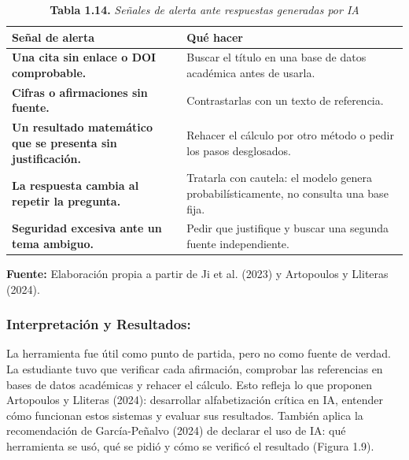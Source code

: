 \begin{table}[htpb!]
\centering
\small\sffamily
\caption{\textbf{Tabla 1.14.} \textit{Señales de alerta ante respuestas generadas por IA}}
\vspace{0.15cm}
\begin{tabularx}{\textwidth}{>{\bfseries}p{5.5cm} >{\raggedright\arraybackslash}X}
\toprule
Señal de alerta & Qué hacer \\
\midrule
Una cita sin enlace o DOI comprobable. & Buscar el título en una base de datos académica antes de usarla. \\
\midrule
Cifras o afirmaciones sin fuente. & Contrastarlas con un texto de referencia. \\
\midrule
Un resultado matemático que se presenta sin justificación. & Rehacer el cálculo por otro método o pedir los pasos desglosados. \\
\midrule
La respuesta cambia al repetir la pregunta. & Tratarla con cautela: el modelo genera probabilísticamente, no consulta una base fija. \\
\midrule
Seguridad excesiva ante un tema ambiguo. & Pedir que justifique y buscar una segunda fuente independiente. \\
\bottomrule
\end{tabularx}
\vspace{0.15cm}
\raggedright\scriptsize \textbf{Fuente:} Elaboración propia a partir de Ji et al. (2023) y Artopoulos y Lliteras (2024).
\end{table}

\subsubsection*{Interpretación y Resultados:}
La herramienta fue útil como punto de partida, pero no como fuente de verdad. La estudiante tuvo que verificar cada afirmación, comprobar las referencias en bases de datos académicas y rehacer el cálculo. Esto refleja lo que proponen Artopoulos y Lliteras (2024): desarrollar alfabetización crítica en IA, entender cómo funcionan estos sistemas y evaluar sus resultados. También aplica la recomendación de García-Peñalvo (2024) de declarar el uso de IA: qué herramienta se usó, qué se pidió y cómo se verificó el resultado (Figura 1.9).

